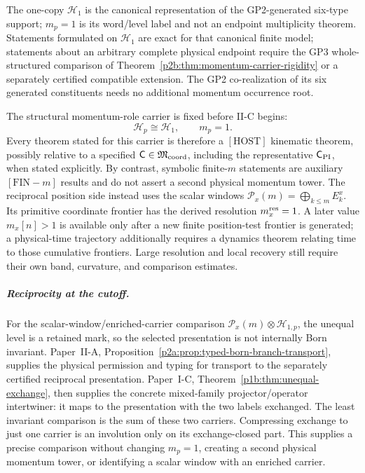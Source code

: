 \documentclass[12pt,a4paper]{article}
\begin{document}
\begin{remark}
\label{p2c:rem:v283-seed-vs-full-carrier}
The one-copy $\mathcal H_1$ is the canonical representation of the
GP2-generated six-type support; $m_p=1$ is its word/level label and not
an endpoint multiplicity theorem.  Statements formulated on
$\mathcal H_1$ are exact for that canonical finite model; statements
about an arbitrary complete physical endpoint require the GP3
whole-structured comparison of
Theorem~\ref{p2b:thm:momentum-carrier-rigidity} or a separately certified
compatible extension.  The GP2 co-realization of its six generated
constituents needs no additional momentum occurrence root.
\end{remark}

\begin{remark}
\label{p2c:rem:v2-finite-level-contract}
The structural momentum-role carrier is fixed before II-C begins:
\[
        \mathcal H_p\cong\mathcal H_1,
        \qquad m_p=1.
\]
Every theorem stated for this carrier is therefore a \([\mathrm{HOST}]\)
kinematic theorem, possibly relative to a specified
\(\mathsf C\in\mathfrak M_{\rm coord}\), including the representative
\(\mathsf C_{\rm PI}\), when stated explicitly.  By contrast, symbolic
finite-\(m\) statements are auxiliary \([\mathrm{FIN}{-}m]\) results and do
not assert a second physical momentum tower.  The reciprocal position side
instead uses the scalar windows
\(\mathcal P_x(m)=\bigoplus_{k\le m}E_k^x\).  Its primitive coordinate
frontier has the derived resolution \(m_x^{\rm res}=1\).  A later value
\(m_x[n]>1\) is available only after a new finite position-test frontier is
generated; a physical-time trajectory additionally requires a dynamics
theorem relating time to those cumulative frontiers.  Large resolution and
local recovery still require their own band, curvature, and comparison
estimates.
\end{remark}

\subparagraph{Reciprocity at the cutoff.}
For the scalar-window/enriched-carrier comparison
\(\mathcal P_x(m)\otimes\mathcal H_{1,p}\), the unequal level is a retained
mark, so the selected presentation is not internally Born invariant.
Paper~II-A, Proposition~\ref{p2a:prop:typed-born-branch-transport}, supplies
the physical permission and typing for transport to the separately certified
reciprocal presentation.  Paper~I-C,
Theorem~\ref{p1b:thm:unequal-exchange}, then supplies the concrete
mixed-family projector/operator intertwiner: it maps to the presentation with
the two labels exchanged.  The least invariant comparison is the sum of these
two carriers.  Compressing exchange to just one carrier is an involution only
on its exchange-closed part.  This supplies a precise comparison without
changing \(m_p=1\), creating a second physical momentum tower, or identifying
a scalar window with an enriched carrier.
\end{document}
